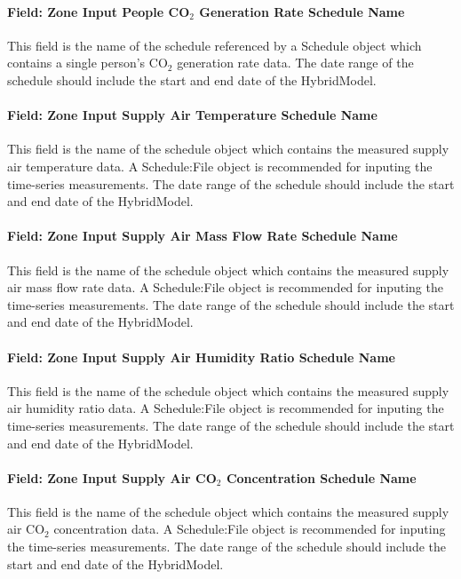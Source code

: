 \paragraph{Field: Zone Input People CO$_2$ Generation Rate Schedule Name}\label{field-zone-input-people-co2-generation-rate-schedule-name-hm}
This field is the name of the schedule referenced by a Schedule object which contains a single person's CO$_2$ generation rate data. The date range of the schedule should include the start and end date of the HybridModel.

\paragraph{Field: Zone Input Supply Air Temperature Schedule Name}\label{field-zone-input-supply-air-temperature-schedule-name-hm}
This field is the name of the schedule object which contains the measured supply air temperature data. A Schedule:File object is recommended for inputing the time-series measurements. The date range of the schedule should include the start and end date of the HybridModel.

\paragraph{Field: Zone Input Supply Air Mass Flow Rate Schedule Name}\label{field-zone-input-supply-air-mass-flow-rate-schedule-name-hm}
This field is the name of the schedule object which contains the measured supply air mass flow rate data. A Schedule:File object is recommended for inputing the time-series measurements. The date range of the schedule should include the start and end date of the HybridModel.

\paragraph{Field: Zone Input Supply Air Humidity Ratio Schedule Name}\label{field-zone-input-supply-air-humidity-ratio-schedule-name-hm}
This field is the name of the schedule object which contains the measured supply air humidity ratio data. A Schedule:File object is recommended for inputing the time-series measurements. The date range of the schedule should include the start and end date of the HybridModel.

\paragraph{Field: Zone Input Supply Air CO$_2$ Concentration Schedule Name}\label{field-zone-input-supply-air-co2-concentration-schedule-name-hm}
This field is the name of the schedule object which contains the measured supply air CO$_2$ concentration data. A Schedule:File object is recommended for inputing the time-series measurements. The date range of the schedule should include the start and end date of the HybridModel.

